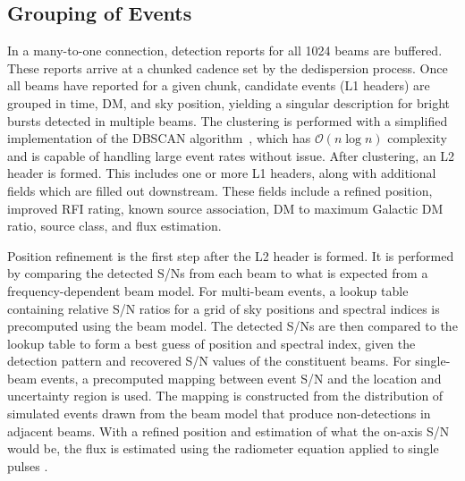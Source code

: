 \documentclass[12pt]{article}
\begin{document}
\setcounter{section}{4}
\setcounter{subsection}{2}

\subsection{Grouping of Events}
In a many-to-one connection, detection reports for all 1024 beams are buffered.
These reports arrive at a chunked cadence set by the dedispersion process.
Once all beams have reported for a given chunk, candidate events (L1 headers)
are grouped in time, DM, and sky position, yielding a singular description for
bright bursts detected in multiple beams. The clustering is performed with a
simplified implementation of the DBSCAN algorithm~\citep{dbscan}, which has
$\mathcal{O}(n\log n)$ complexity and is capable of handling large event rates
without issue. After clustering, an L2 header is formed. This includes one or
more L1 headers, along with additional fields which are filled out downstream.
These fields include a refined position, improved RFI rating, known source
association, DM to maximum Galactic DM ratio, source class, and flux
estimation.
 
Position refinement is the first step after the L2 header is
formed. It is performed by comparing the detected S/Ns from each beam 
to what is expected from a frequency-dependent beam model. 
For multi-beam events, a lookup table 
containing relative S/N ratios for a grid of sky positions and spectral indices
is precomputed using the beam model. The detected S/Ns are then compared
to the lookup table to form a best guess of position and spectral index, 
given the detection pattern and recovered S/N values of the constituent beams. 
For single-beam events, a precomputed mapping between event S/N
and the location and uncertainty region is used. The mapping is constructed
from the distribution of simulated events drawn from the beam model that 
produce non-detections in adjacent beams. With a refined position and
estimation of what the on-axis S/N would be, the flux is estimated using the
radiometer equation applied to single pulses \citep{cordes_mclaughlin03}.

\printbibliography{}
\end{document}
